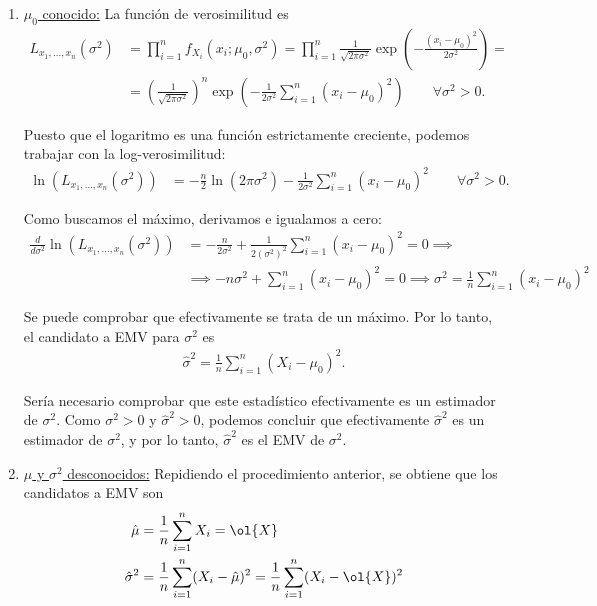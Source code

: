 \begin{ejemplo}
\begin{enumerate}
        Sería necesario comprobar que este estadístico efectivamente es un estimador de $\mu$. Como $\mu\in \mathbb{R}$ y $\hat{\mu}\in \mathbb{R}$, podemos concluir que efectivamente $\hat{\mu}$ es un estimador de $\mu$, y por lo tanto, $\hat{\mu}$ es el EMV de $\mu$.

        \item \ul{$\mu_0$ conocido:} La función de verosimilitud es
        \begin{align*}
            L_{x_1, \ldots, x_n}(\sigma^2) &= \prod_{i=1}^{n} f_{X_i}(x_i; \mu_0, \sigma^2) = \prod_{i=1}^{n} \frac{1}{\sqrt{2\pi\sigma^2}} \exp(-\frac{(x_i - \mu_0)^2}{2\sigma^2}) =\\&= \left(\frac{1}{\sqrt{2\pi\sigma^2}}\right)^n \exp\left(-\frac{1}{2\sigma^2} \sum_{i=1}^{n} (x_i - \mu_0)^2\right)\qquad \forall \sigma^2 > 0.
        \end{align*}

        Puesto que el logaritmo es una función estrictamente creciente, podemos trabajar con la log-verosimilitud:
        \begin{align*}
            \ln(L_{x_1, \ldots, x_n}(\sigma^2)) &= -\frac{n}{2}\ln(2\pi\sigma^2) - \frac{1}{2\sigma^2} \sum_{i=1}^{n} (x_i - \mu_0)^2\qquad \forall \sigma^2 > 0.
        \end{align*}

        Como buscamos el máximo, derivamos e igualamos a cero:
        \begin{align*}
            \frac{d}{d\sigma^2} \ln(L_{x_1, \ldots, x_n}(\sigma^2)) &= -\frac{n}{2\sigma^2} + \frac{1}{2(\sigma^2)^2} \sum_{i=1}^{n} (x_i - \mu_0)^2 = 0 \implies \\&\implies -n\sigma^2 + \sum_{i=1}^{n} (x_i - \mu_0)^2 = 0 \implies \sigma^2 = \frac{1}{n} \sum_{i=1}^{n} (x_i - \mu_0)^2
        \end{align*}

        Se puede comprobar que efectivamente se trata de un máximo. Por lo tanto, el candidato a EMV para $\sigma^2$ es
        \begin{align*}
            \hat{\sigma}^2 = \frac{1}{n} \sum_{i=1}^{n} (X_i - \mu_0)^2.
        \end{align*}

        Sería necesario comprobar que este estadístico efectivamente es un estimador de $\sigma^2$. Como $\sigma^2 > 0$ y $\hat{\sigma}^2 > 0$, podemos concluir que efectivamente $\hat{\sigma}^2$ es un estimador de $\sigma^2$, y por lo tanto, $\hat{\sigma}^2$ es el EMV de $\sigma^2$.

        \item \ul{$\mu$ y $\sigma^2$ desconocidos:} Repidiendo el procedimiento anterior, se obtiene que los candidatos a EMV son
        \begin{align*}
            \hat{\mu} &= \frac{1}{n} \sum_{i=1}^{n} X_i = \ol{X}\\
            \hat{\sigma}^2 &= \frac{1}{n} \sum_{i=1}^{n} (X_i - \hat{\mu})^2 = \frac{1}{n} \sum_{i=1}^{n} (X_i - \ol{X})^2
        \end{align*}
    \end{enumerate}
\end{ejemplo}

